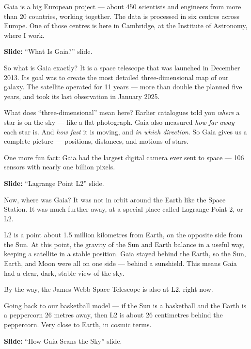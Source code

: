 \documentclass[10pt,a4paper]{article}
\newenvironment{slidenote}
  {\begin{mdframed}[linecolor=green!50!black, backgroundcolor=green!5, linewidth=1pt]%
   \small\color{green!40!black}\textbf{Slide:} }
  {\end{mdframed}}
\begin{document}
Gaia is a big European project --- about 450 scientists and engineers from more than 20 countries, working together. The data is processed in six centres across Europe. One of those centres is here in Cambridge, at the Institute of Astronomy, where I work.

\begin{slidenote}
``What Is Gaia?'' slide.
\end{slidenote}

So what is Gaia exactly? It is a space telescope that was launched in December 2013. Its goal was to create the most detailed three-dimensional map of our galaxy. The satellite operated for 11 years --- more than double the planned five years, and took its last observation in January 2025.

What does ``three-dimensional'' mean here? Earlier catalogues told you \emph{where} a star is on the sky --- like a flat photograph. Gaia also measured \emph{how far away} each star is. And \emph{how fast} it is moving, and \emph{in which direction}. So Gaia gives us a complete picture --- positions, distances, and motions of stars.

One more fun fact: Gaia had the largest digital camera ever sent to space --- 106 sensors with nearly one billion pixels.

\begin{slidenote}
``Lagrange Point L2'' slide.
\end{slidenote}

Now, where was Gaia? It was not in orbit around the Earth like the Space Station. It was much further away, at a special place called Lagrange Point 2, or L2.

L2 is a point about 1.5 million kilometres from Earth, on the opposite side from the Sun. At this point, the gravity of the Sun and Earth balance in a useful way, keeping a satellite in a stable position. Gaia stayed behind the Earth, so the Sun, Earth, and Moon were all on one side --- behind a sunshield. This means Gaia had a clear, dark, stable view of the sky.

By the way, the James Webb Space Telescope is also at L2, right now.

Going back to our basketball model --- if the Sun is a basketball and the Earth is a peppercorn 26 metres away, then L2 is about 26 centimetres behind the peppercorn. Very close to Earth, in cosmic terms.

\begin{slidenote}
``How Gaia Scans the Sky'' slide.
\end{slidenote}
\end{document}
